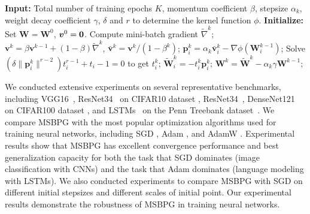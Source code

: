 \documentclass[twoside,11pt]{article}
\def\vp{{\bm{p}}}
\def\vv{{\bm{v}}}
\def\mW{{\bm{W}}}
\begin{document}
{\begin{algorithm}[ht] 
    \caption{MSBPG with $L_2$ regularization}
    \begin{algorithmic}[1]
        \State \textbf{Input: }Total number of training epochs $K$, momentum coefficient $\beta$, stepsize $\alpha_k$, weight decay coefficient $\gamma$, $\delta$ and $r$ to determine the kernel function $\phi$.
        \State \textbf{Initialize: } Set $\mW=\mW^0$, $\vv^0=\bf{0}$.
        \State Compute mini-batch gradient $\widetilde{\nabla}^k$;
        \State $\vv^k = \beta\vv^{k-1} + (1-\beta) \widetilde{\nabla}^k$, $\bar{\vv}^k = \vv^k / (1 - \beta^k)$;
        \State $\vp_i^k = \alpha_k \bar{\vv}_i^k - \nabla\phi(\mW^{k-1}_i)$;
        \State Solve $(\delta \|\vp^k_i\|^{r-2})t_i^{r-1} + t_i -1 =0$ to get $t_i^k$;
        \State $\widetilde{\mW}_i^{k} = - t_i^k \vp_i^k$;
        \EndFor
        \State $\mW^k = \widetilde{\mW}^k - \alpha_k \gamma \mW^{k-1}$;
        \EndFor
        \State {\bf Output: $\mW^1, \cdots, \mW^K$}
    \end{algorithmic}\label{dl-alg-sbpg}
\end{algorithm}


We conducted extensive experiments on several representative benchmarks, including VGG16~\citep{simonyan2014very}, ResNet34~\citep{he2016deep} on CIFAR10 dataset \citep{krizhevsky2009learning}, ResNet34~\citep{he2016deep}, DenseNet121~\citep{huang2017densely} on CIFAR100 dataset \citep{krizhevsky2009learning},
and LSTMs~\citep{schmidhuber1997long} on the Penn Treebank dataset~\citep{marcinkiewicz1994building}. We compare MSBPG  with the most popular optimization algorithms used for training neural networks, including SGD \citep{sutskever2013importance}, Adam \citep{kingma2014adam}, and AdamW \citep{loshchilov2017decoupled}. Experimental results show that MSBPG  has excellent convergence performance and best generalization capacity for both the task that SGD dominates (image classification with CNNs) and the task that Adam dominates (language modeling with LSTMs). We also conducted experiments to compare MSBPG  with SGD on different initial stepsizes and different scales of initial point. Our experimental results demonstrate the robustness of MSBPG  in training neural networks.

}
\end{document}
